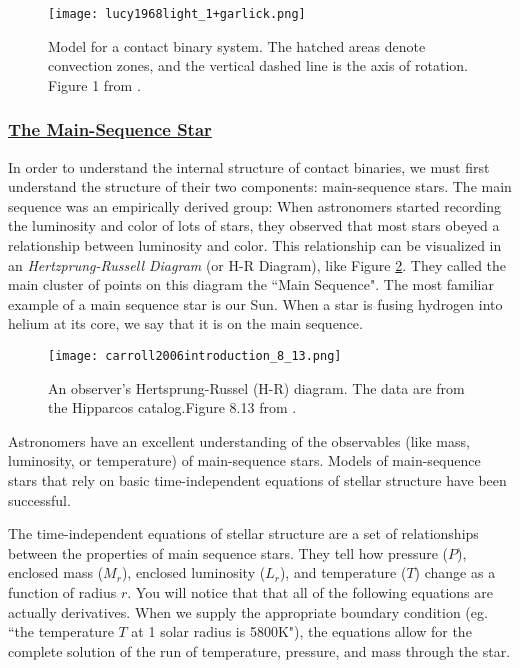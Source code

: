 \documentclass[12pt]{article} %
\numberwithin{equation}{section} %
\begin{document}
\begin{figure}[H]
\centering
\texttt{[image: lucy1968light\_1+garlick.png]}
\caption{Model for a contact binary system. The hatched areas denote convection zones, and the vertical dashed line is the axis of rotation. Figure 1 from \citet{lucy1968light}.}
\label{fig: lucy1968light_1}
\end{figure}

\subsubsection[The Main-Sequence Star]{\hyperlink{toc}{The Main-Sequence Star}} \label{sec: The Main-Sequence Star}

In order to understand the internal structure of contact binaries, we must first understand the structure of their two components: main-sequence stars.  The main sequence was an empirically derived group: When astronomers started recording the luminosity and color of lots of stars, they observed that most stars obeyed a relationship between luminosity and color. This relationship can be visualized in an \emph{Hertzprung-Russell Diagram} (or H-R  Diagram), like Figure \ref{fig: carroll2006introduction_8_13}. They called the main cluster of points on this diagram the ``Main Sequence". The most familiar example of a main sequence star is our Sun. When a star is fusing hydrogen into helium at its core, we say that it is on the main sequence.

\begin{figure}[H]
\centering
\texttt{[image: carroll2006introduction\_8\_13.png]}
\caption{An observer's Hertsprung-Russel (H-R) diagram. The data are from the Hipparcos catalog.Figure 8.13 from \citet{carroll2006introduction}.}
\label{fig: carroll2006introduction_8_13}
\end{figure}

Astronomers have an excellent understanding of the observables (like mass, luminosity, or temperature) of main-sequence stars. Models of main-sequence stars that rely on basic time-independent equations of stellar structure have been successful.

The time-independent equations of stellar structure  are a set of relationships between the properties of main sequence stars. They tell how pressure ($P$), enclosed mass ($M_{r}$), enclosed luminosity ($L_{r}$), and temperature ($T$) change as a function of radius $r$. You will notice that that all of the following equations are actually derivatives. When we supply the appropriate boundary condition (eg. ``the temperature $T$ at 1 solar radius is 5800K"), the equations allow for the complete solution of the run of temperature, pressure, and mass through the star.
\end{document}
